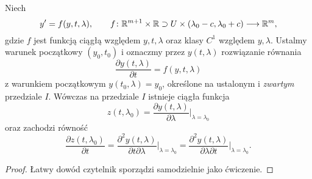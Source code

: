
\begin{theorem}
  Niech
  \begin{equation*}
    y' = f(y,t,\lambda), \qquad
    f \colon \mathbb{R}^{m+1} \times \mathbb{R} \supset U \times (\lambda_0 - c, \lambda_0 + c) \longrightarrow \mathbb{R}^m,
  \end{equation*}
  gdzie $f$ jest funkcją ciągłą względem $y,t,\lambda$ oraz klasy $C^1$ względem $y,\lambda$. Ustalmy warunek 
  początkowy $(y_0,t_0)$ i oznaczmy przez $y(t,\lambda)$ rozwiązanie równania
  \begin{equation*}
    \frac{\partial y(t,\lambda)}{\partial t} = f(y,t,\lambda)
  \end{equation*}
  z warunkiem początkowym $y(t_0,\lambda) = y_0$, określone na ustalonym i \emph{zwartym} przedziale $I$. Wówczas na 
  przedziale $I$ istnieje ciągła funkcja
  \begin{equation*}
    z(t,\lambda_0) = \frac{\partial y(t,\lambda)}{\partial \lambda} \Big\vert_{\lambda = \lambda_0}
  \end{equation*}
  oraz zachodzi równość
  \begin{equation*}
    \frac{\partial z(t,\lambda_0)}{\partial t} =
    \frac{\partial^2 y(t,\lambda)}{\partial t \partial \lambda} \Big\vert_{\lambda = \lambda_0} =
    \frac{\partial^2 y(t,\lambda)}{\partial \lambda \partial t} \Big\vert_{\lambda = \lambda_0}.
  \end{equation*}
\end{theorem}

\begin{proof}
  Łatwy dowód czytelnik sporządzi samodzielnie jako ćwiczenie.
\end{proof}

































